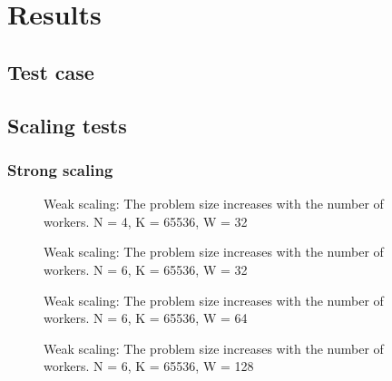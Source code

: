 \chapter{Results} \label{chapter:results}

\section{Test case} \label{section:results:test_case}

\section{Scaling tests} \label{section:results:scaling_tests}

\subsection{Strong scaling} \label{section:results:scaling_tests:strong}

\begin{figure}[H]
	\centering
	
	\caption{Weak scaling: The problem size increases with the number of workers. N = 4, K = 65536, W = 32}
	\label{fig:strong_scaling_N4_W32}
\end{figure}

\begin{figure}[H]
	\centering
	
	\caption{Weak scaling: The problem size increases with the number of workers. N = 6, K = 65536, W = 32}
	\label{fig:strong_scaling_N6_W32}
\end{figure}

\begin{figure}[H]
	\centering
	
	\caption{Weak scaling: The problem size increases with the number of workers. N = 6, K = 65536, W = 64}
	\label{fig:strong_scaling_N6_W64}
\end{figure}

\begin{figure}[H]
	\centering
	
	\caption{Weak scaling: The problem size increases with the number of workers. N = 6, K = 65536, W = 128}
	\label{fig:strong_scaling_N6_W128}
\end{figure}

